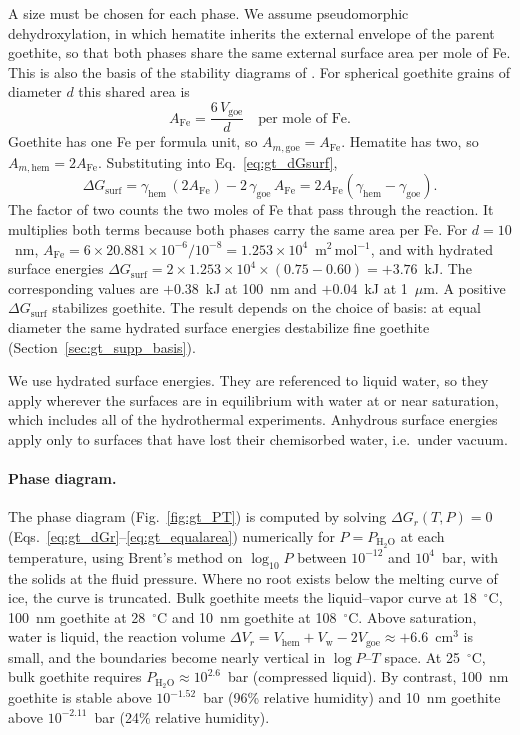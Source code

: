 A size must be chosen for each phase. We assume pseudomorphic dehydroxylation, in which hematite
inherits the external envelope of the parent goethite, so that both phases share the same
external surface area per mole of Fe. This is also the basis of the stability diagrams of
\citet{navrotsky2008}. For spherical goethite grains of diameter $d$ this shared area is
\begin{equation}
  A_{\mathrm{Fe}} = \frac{6\,V_{\mathrm{goe}}}{d}\quad\text{per mole of Fe}.
\end{equation}
Goethite has one Fe per formula unit, so $A_{m,\mathrm{goe}} = A_{\mathrm{Fe}}$. Hematite has two,
so $A_{m,\mathrm{hem}} = 2A_{\mathrm{Fe}}$. Substituting into Eq.~\ref{eq:gt_dGsurf},
\begin{equation}
  \Delta G_{\mathrm{surf}} = \gamma_{\mathrm{hem}}\,(2A_{\mathrm{Fe}}) - 2\,\gamma_{\mathrm{goe}}\,A_{\mathrm{Fe}}
  = 2A_{\mathrm{Fe}}\left(\gamma_{\mathrm{hem}} - \gamma_{\mathrm{goe}}\right).
  \label{eq:gt_equalarea}
\end{equation}
The factor of two counts the two moles of Fe that pass through the reaction. It multiplies both
terms because both phases carry the same area per Fe. For $d=10$~nm,
$A_{\mathrm{Fe}} = 6\times20.881\times10^{-6}/10^{-8} = 1.253\times10^{4}$~m$^2$\,mol$^{-1}$, and
with hydrated surface energies
$\Delta G_{\mathrm{surf}} = 2\times1.253\times10^{4}\times(0.75-0.60) = +3.76$~kJ.
The corresponding values are $+0.38$~kJ at 100~nm and $+0.04$~kJ at 1~$\mu$m. A positive
$\Delta G_{\mathrm{surf}}$ stabilizes goethite. The result depends on the choice of basis: at
equal diameter the same hydrated surface energies destabilize fine goethite
(Section~\ref{sec:gt_supp_basis}).

We use hydrated surface energies. They are referenced to liquid water, so they apply wherever the
surfaces are in equilibrium with water at or near saturation, which includes all of the
hydrothermal experiments. Anhydrous surface energies apply only to surfaces that have lost their
chemisorbed water, i.e.\ under vacuum.

\paragraph{Phase diagram.} The phase diagram (Fig.~\ref{fig:gt_PT}) is computed by solving
$\Delta G_r(T,P) = 0$ (Eqs.~\ref{eq:gt_dGr}--\ref{eq:gt_equalarea}) numerically for
$P = P_{\mathrm{H_2O}}$ at each temperature, using Brent's method on $\log_{10}P$ between
$10^{-12}$ and $10^{4}$~bar, with the solids at the fluid pressure. Where no root exists below the
melting curve of ice, the curve is truncated. Bulk goethite meets the liquid--vapor curve at
18~$^\circ$C, 100~nm goethite at 28~$^\circ$C and 10~nm goethite at 108~$^\circ$C. Above saturation,
water is liquid, the reaction volume
$\Delta V_r = V_{\mathrm{hem}} + V_{\mathrm{w}} - 2V_{\mathrm{goe}} \approx +6.6$~cm$^3$ is small, and the
boundaries become nearly vertical in $\log P$--$T$ space. At 25~$^\circ$C, bulk goethite requires
$P_{\mathrm{H_2O}}\approx10^{2.6}$~bar (compressed liquid). By contrast, 100~nm goethite is stable
above $10^{-1.52}$~bar (96\% relative humidity) and 10~nm goethite above $10^{-2.11}$~bar (24\%
relative humidity).


